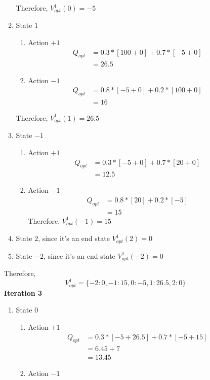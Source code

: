\documentclass[12pt]{article}
\begin{document}
\begin{enumerate}[label=(\alph*)]
\begin{enumerate}
 	Therefore, $V_{opt}^1(0) = -5$
 	\item State $1$ \\
 	\begin{enumerate}
 		\item Action $+1$
 		\begin{align*}
 		Q_{opt} &= 0.3 * [100 + 0] + 0.7 * [-5 + 0] \\
 		&= 26.5
 		\end{align*}
 		\item Action $-1$
 		\begin{align*}
 		Q_{opt} &= 0.8 * [-5 + 0] + 0.2 * [100 + 0] \\
 		&= 16
 		\end{align*}
 	\end{enumerate}
 	Therefore, $V_{opt}^1(1) = 26.5$
 	\item State $-1$ \\
 	\begin{enumerate}
 		\item Action $+1$
 		\begin{align*}
 		Q_{opt} &= 0.3 * [-5 + 0] + 0.7 * [20 + 0] \\
 		&= 12.5
 		\end{align*}
 		\item Action $-1$
 		\begin{align*}
 		Q_{opt} &= 0.8 * [20] + 0.2 * [-5] \\
 		&= 15
 		\end{align*}
 		Therefore, $V_{opt}^1(-1) = 15$
 	\end{enumerate}
 	\item State $2$, since it's an end state $V_{opt}^1(2) = 0$
 	\item State $-2$, since it's an end state $V_{opt}^1(-2) = 0$
 \end{enumerate}
 Therefore,
 $$V_{opt}^1 = \{ -2:0, -1: 15, 0: -5, 1: 26.5, 2:0 \}$$
 \textbf{Iteration 3}
 \begin{enumerate}
 \item State $0$
 \begin{enumerate}
	\item Action $+1$
	 \begin{align*}
	 Q_{opt} &= 0.3 * [-5 + 26.5] + 0.7 * [-5 + 15] \\
	 &= 6.45 + 7 \\
	 &= 13.45
	 \end{align*} 
	 \item Action $-1$
	 \begin{align*}

\end{align*}
\end{enumerate}
\end{enumerate}
\end{enumerate}
\end{document}
